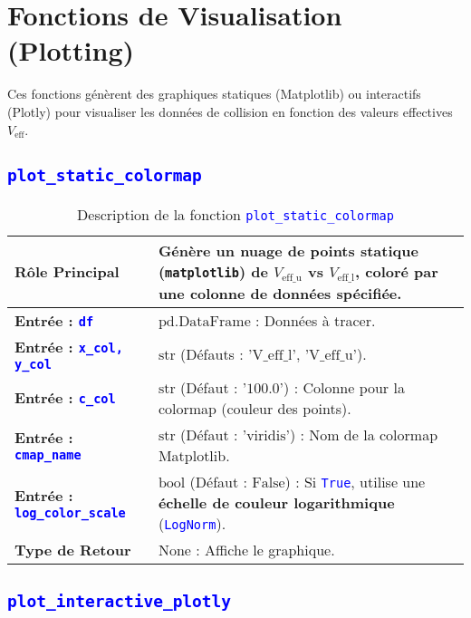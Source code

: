 \documentclass{article}
\newcommand{\code}[1]{\texttt{\textcolor{blue}{#1}}}
\begin{document}
\section{Fonctions de Visualisation (Plotting)}

Ces fonctions génèrent des graphiques statiques (Matplotlib) ou interactifs (Plotly) pour visualiser les données de collision en fonction des valeurs effectives $V_{\text{eff}}$.

\subsection{\code{plot\_static\_colormap}}

\begin{longtable}{|>{\raggedright\arraybackslash}p{}|>{\raggedright\arraybackslash}p{}|}
    \caption{Description de la fonction \code{plot\_static\_colormap}} \\
    \toprule
    \textbf{Rôle Principal} & Génère un nuage de points \textbf{statique} (\texttt{matplotlib}) de $V_{\text{eff\_u}}$ vs $V_{\text{eff\_l}}$, coloré par une colonne de données spécifiée. \\
    \midrule
    \textbf{Entrée : \code{df}} & $\text{pd.DataFrame}$ : Données à tracer. \\
    \midrule
    \textbf{Entrée : \code{x\_col, y\_col}} & $\text{str}$ (Défauts : $\text{'V\_eff\_l', 'V\_eff\_u'}$). \\
    \midrule
    \textbf{Entrée : \code{c\_col}} & $\text{str}$ (Défaut : $\text{'100.0'}$) : Colonne pour la colormap (couleur des points). \\
    \midrule
    \textbf{Entrée : \code{cmap\_name}} & $\text{str}$ (Défaut : $\text{'viridis'}$) : Nom de la colormap Matplotlib. \\
    \midrule
    \textbf{Entrée : \code{log\_color\_scale}} & $\text{bool}$ (Défaut : $\text{False}$) : Si \code{True}, utilise une \textbf{échelle de couleur logarithmique} (\code{LogNorm}). \\
    \midrule
    \textbf{Type de Retour} & $\text{None}$ : Affiche le graphique. \\
    \bottomrule
\end{longtable}

\subsection{\code{plot\_interactive\_plotly}}
\end{document}

